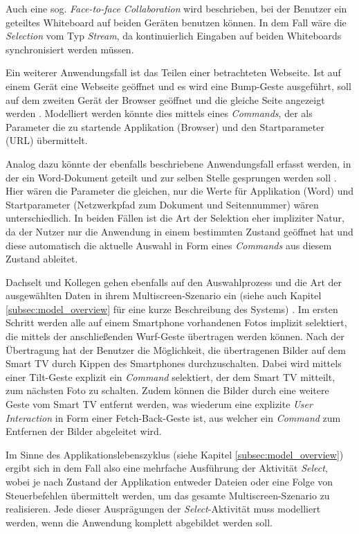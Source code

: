Auch eine sog. \textit{Face-to-face Collaboration} wird beschrieben, bei der Benutzer ein geteiltes Whiteboard auf beiden Geräten benutzen können. In dem Fall wäre die \textit{Selection} vom Typ \textit{Stream}, da kontinuierlich Eingaben auf beiden Whiteboards synchronisiert werden müssen.

Ein weiterer Anwendungsfall ist das Teilen einer betrachteten Webseite. Ist auf einem Gerät eine Webseite geöffnet und es wird eine Bump-Geste ausgeführt, soll auf dem zweiten Gerät der Browser geöffnet und die gleiche Seite angezeigt werden \citep{Hinckley2003}. Modelliert werden könnte dies mittels eines \textit{Commands}, der als Parameter die zu startende Applikation (Browser) und den Startparameter (\acs{URL}) übermittelt.

Analog dazu könnte der ebenfalls beschriebene Anwendungsfall erfasst werden, in der ein Word-Dokument geteilt und zur selben Stelle gesprungen werden soll \citep{Hinckley2003}. Hier wären die Parameter die gleichen, nur die Werte für Applikation (Word) und Startparameter (Netzwerkpfad zum Dokument und Seitennummer) wären unterschiedlich. In beiden Fällen ist die Art der Selektion eher impliziter Natur, da der Nutzer nur die Anwendung in einem bestimmten Zustand geöffnet hat und diese automatisch die aktuelle Auswahl in Form eines \textit{Commands} aus diesem Zustand ableitet.

Dachselt und Kollegen gehen ebenfalls auf den Auswahlprozess und die Art der ausgewählten Daten in ihrem Multiscreen-Szenario ein (siehe auch Kapitel \ref{subsec:model_overview} für eine kurze Beschreibung des Systems) \citep{Dachselt2009}. Im ersten Schritt werden alle auf einem Smartphone vorhandenen Fotos implizit selektiert, die mittels der anschließenden Wurf-Geste übertragen werden können. Nach der Übertragung hat der Benutzer die Möglichkeit, die übertragenen Bilder auf dem Smart TV durch Kippen des Smartphones durchzuschalten. Dabei wird mittels einer Tilt-Geste explizit ein \textit{Command} selektiert, der dem Smart TV mitteilt, zum nächsten Foto zu schalten. Zudem können die Bilder durch eine weitere Geste vom Smart TV entfernt werden, was wiederum eine explizite \textit{User Interaction} in Form einer Fetch-Back-Geste ist, aus welcher ein \textit{Command} zum Entfernen der Bilder abgeleitet wird. 

Im Sinne des Applikationslebenszyklus (siehe Kapitel \ref{subsec:model_overview}) ergibt sich in dem Fall also eine mehrfache Ausführung der Aktivität \textit{Select}, wobei je nach Zustand der Applikation entweder Dateien oder eine Folge von Steuerbefehlen übermittelt werden, um das gesamte Multiscreen-Szenario zu realisieren. Jede dieser Ausprägungen der \textit{Select}-Aktivität muss  modelliert werden, wenn die Anwendung komplett abgebildet werden soll.

